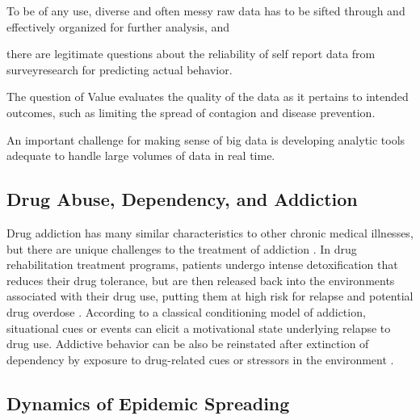\documentclass[sigconf]{acmart}
\begin{document}
To be of any use, diverse and often messy raw data has to be sifted through and 
effectively organized for further analysis, and 

there are legitimate questions about the reliability of self report data from 
surveyresearch for predicting actual behavior. 

The question of Value evaluates the quality of the data as it pertains to 
intended outcomes, such as limiting the spread of contagion and disease 
prevention. 

An important challenge for making sense of big data is developing analytic 
tools adequate to handle large volumes of data in real time.

\subsection{Drug Abuse, Dependency, and Addiction}

Drug addiction has many similar characteristics to other chronic medical 
illnesses, but there are unique challenges to the treatment of addiction
\cite{marsch12, swendson16}. In drug rehabilitation treatment programs, 
patients undergo intense detoxification that reduces their drug tolerance, but 
are then released back into the environments associated with their drug use, 
putting them at high risk for relapse and potential drug overdose 
\cite{johnson11}. According to a classical conditioning model of addiction, 
situational cues or events can elicit a motivational state underlying relapse 
to drug use. Addictive behavior can be also be reinstated after extinction of 
dependency by exposure to drug-related cues or stressors in the environment 
\cite{shaham03}. 


\subsection{Dynamics of Epidemic Spreading}
\end{document}
